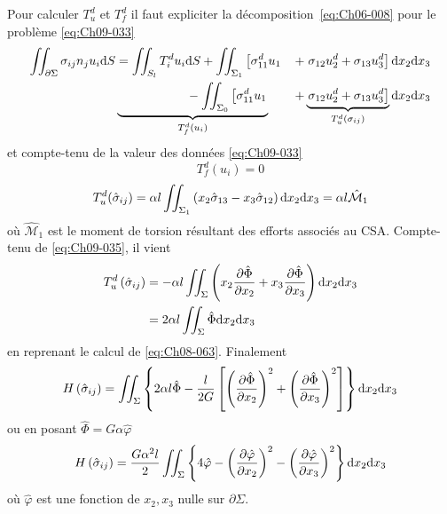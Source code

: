 Pour calculer $T_u^d$ et $T_f^d$ il faut expliciter la décomposition~\eqref{eq:Ch06-008} pour le problème \eqref{eq:Ch09-033} 
\begin{equation*}
    \begin{aligned}
        \iint_{\partial \Sigma} \sigma_{ij} n_j u_i \ud S &= \iint_{S_l} T_i^d u_i \ud S + \iint_{\Sigma_1} \left[ \sigma_{11}^d u_1 \right. &+ \left. \sigma_{12} u_2^d + \sigma_{13} u_3^d \right] \ud x_2 \ud x_3 \\
        & \underbrace{\phantom{\iint_{S_l} T_i^d u_i \ud S} -\iint_{\Sigma_0} \left[ \sigma_{11}^d u_1 \right.}_{T_f^d (u_i)} &+\underbrace{\left. \sigma_{12} u_2^d + \sigma_{13} u_3^d \right]}_{T_u^d (\sigma_{ij})} \ud x_2 \ud x_3
    \end{aligned}
\end{equation*}
et compte-tenu de la valeur des données \eqref{eq:Ch09-033} 
\begin{equation}
    T_f^d (u_i) = 0
    \label{eq:Ch09-038}
\end{equation}
\begin{equation}
    T_u^d (\hat{\sigma}_{ij}) = \alpha l  \iint_{\Sigma_1} \left( x_2 \hat{\sigma}_{13} - x_3 \hat{\sigma}_{12} \right) \mathrm{d} x_2 \mathrm{d} x_3 = \alpha l \hat{\mathcal{M}}_1
    \label{eq:Ch09-039}
\end{equation}
où $\hat{\mathcal{M}}_1$ est le moment de torsion résultant des efforts associés au CSA.
Compte-tenu de \eqref{eq:Ch09-035}, il vient 
\begin{align*}
    T_u^d \left( \hat{\sigma}_{ij} \right) &= - \alpha l \iint_{\Sigma} \left( x_2 \frac{\partial \hat{\Phi}}{\partial x_2} + x_3 \frac{\partial \hat{\Phi}}{\partial x_3} \right) \mathrm{d} x_2 \mathrm{d} x_3 \\
    &= 2 \alpha l \iint_{\Sigma} \hat{\Phi} \mathrm{d} x_2 \mathrm{d} x_3
\end{align*}
en reprenant le calcul de \eqref{eq:Ch08-063}.
Finalement 
\begin{equation}
    H \left( \hat{\sigma}_{ij} \right) = \iint_{\Sigma} \left\{ 2 \alpha l \hat{\Phi} - \frac{l}{2G} \left[ \left( \frac{\partial \hat{\Phi}}{\partial x_2} \right)^2 + \left( \frac{\partial \hat{\Phi}}{\partial x_3} \right)^2 \right] \right\} \mathrm{d} x_2 \mathrm{d} x_3
    \label{eq:Ch09-040}
\end{equation}
ou en posant $\hat{\Phi} = G \alpha \hat{\varphi}$
\begin{equation}
    H \left( \hat{\sigma}_{ij} \right) = \frac{G\alpha^2 l}{2} \iint_{\Sigma} \left\{ 4 \hat{\varphi} - \left( \frac{\partial \hat{\varphi}}{\partial x_2} \right)^2 - \left( \frac{\partial \hat{\varphi}}{\partial x_3} \right)^2 \right\} \mathrm{d} x_2 \mathrm{d} x_3
    \label{eq:Ch09-041}
\end{equation}
où $\hat{\varphi}$ est une fonction de $x_2,x_3$ nulle sur $\partial \Sigma$.

